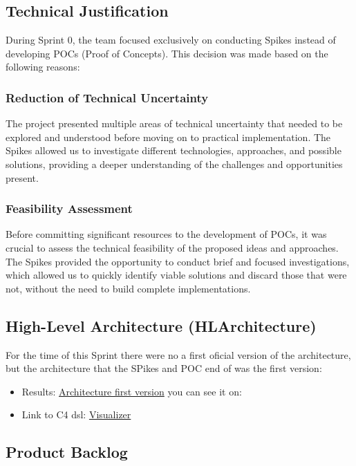 \documentclass[a4paper,12pt]{article}
\begin{document}
\subsection{Technical Justification}

During Sprint 0, the team focused exclusively on conducting Spikes instead of developing POCs (Proof of Concepts). This decision was made based on the following reasons:

\subsubsection{Reduction of Technical Uncertainty}
The project presented multiple areas of technical uncertainty that needed to be explored and understood before moving on to practical implementation. The Spikes allowed us to investigate different technologies, approaches, and possible solutions, providing a deeper understanding of the challenges and opportunities present.

\subsubsection{Feasibility Assessment}
Before committing significant resources to the development of POCs, it was crucial to assess the technical feasibility of the proposed ideas and approaches. The Spikes provided the opportunity to conduct brief and focused investigations, which allowed us to quickly identify viable solutions and discard those that were not, without the need to build complete implementations.


\subsection{High-Level Architecture (HLArchitecture)}
For the time of this Sprint there were no a first oficial version of the architecture, but the architecture that the SPikes and POC end of was the first version:
\begin{itemize}
\item Results: \href{https://github.com/Pending-Name-21/arquitecture/pull/1/files}{Architecture first version}
you can see it on: 
\item Link to C4 dsl: \href{https://structurizr.com/dsl}{Visualizer}
\end{itemize}
\newpage
\subsection{Product Backlog}
\end{document}
